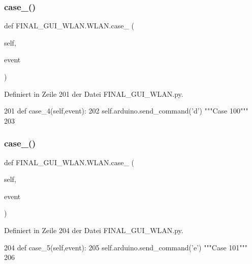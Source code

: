 \subsubsection{\texorpdfstring{case\+\_()}{case\_4()}}
{\footnotesize\ttfamily def F\+I\+N\+A\+L\+\_\+\+G\+U\+I\+\_\+\+W\+L\+A\+N.\+W\+L\+A\+N.\+case\+\_ (\begin{DoxyParamCaption}\item[{}]{self,  }\item[{}]{event }\end{DoxyParamCaption})}



Definiert in Zeile 201 der Datei F\+I\+N\+A\+L\+\_\+\+G\+U\+I\+\_\+\+W\+L\+A\+N.\+py.


\begin{DoxyCode}
201     \textcolor{keyword}{def }case\_4(self,event):
202         self.arduino.send\_command(\textcolor{stringliteral}{'d'})  \textcolor{stringliteral}{"""Case 100"""}
203 
\end{DoxyCode}
\mbox{\label{class_f_i_n_a_l___g_u_i___w_l_a_n_1_1_w_l_a_n_ab52a928c6ffe8d1e58187b82c485bc41}} 
\subsubsection{\texorpdfstring{case\+\_()}{case\_5()}}
{\footnotesize\ttfamily def F\+I\+N\+A\+L\+\_\+\+G\+U\+I\+\_\+\+W\+L\+A\+N.\+W\+L\+A\+N.\+case\+\_ (\begin{DoxyParamCaption}\item[{}]{self,  }\item[{}]{event }\end{DoxyParamCaption})}



Definiert in Zeile 204 der Datei F\+I\+N\+A\+L\+\_\+\+G\+U\+I\+\_\+\+W\+L\+A\+N.\+py.


\begin{DoxyCode}
204     \textcolor{keyword}{def }case\_5(self,event):
205         self.arduino.send\_command(\textcolor{stringliteral}{'e'})  \textcolor{stringliteral}{"""Case 101"""}
206 
\end{DoxyCode}
\mbox{\label{class_f_i_n_a_l___g_u_i___w_l_a_n_1_1_w_l_a_n_a508d6895200febe57522b7cb719da925}} 
